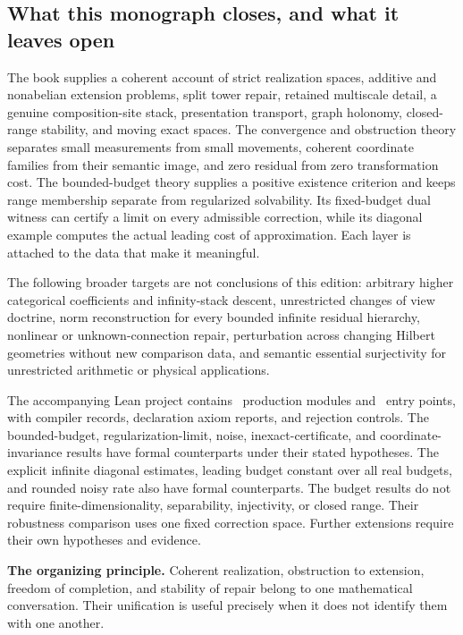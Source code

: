 \subsection{What this monograph closes, and what it leaves open}
The book supplies a coherent account of strict realization spaces, additive and nonabelian extension problems, split tower repair, retained multiscale detail, a genuine composition-site stack, presentation transport, graph holonomy, closed-range stability, and moving exact spaces. The convergence and obstruction theory separates small measurements from small movements, coherent coordinate families from their semantic image, and zero residual from zero transformation cost. The bounded-budget theory supplies a positive existence criterion and keeps range membership separate from regularized solvability. Its fixed-budget dual witness can certify a limit on every admissible correction, while its diagonal example computes the actual leading cost of approximation. Each layer is attached to the data that make it meaningful.

The following broader targets are not conclusions of this edition: arbitrary higher categorical coefficients and infinity-stack descent, unrestricted changes of view doctrine, norm reconstruction for every bounded infinite residual hierarchy, nonlinear or unknown-connection repair, perturbation across changing Hilbert geometries without new comparison data, and semantic essential surjectivity for unrestricted arithmetic or physical applications.

The accompanying Lean project contains \EditionProductionModules\ production modules and \EditionRoots\ entry points, with compiler records, declaration axiom reports, and rejection controls. The bounded-budget, regularization-limit, noise, inexact-certificate, and coordinate-invariance results have formal counterparts under their stated hypotheses. The explicit infinite diagonal estimates, leading budget constant over all real budgets, and rounded noisy rate also have formal counterparts. The budget results do not require finite-dimensionality, separability, injectivity, or closed range. Their robustness comparison uses one fixed correction space. Further extensions require their own hypotheses and evidence.

\begin{insight}
\textbf{The organizing principle.} Coherent realization, obstruction to extension, freedom of completion, and stability of repair belong to one mathematical conversation. Their unification is useful precisely when it does not identify them with one another.
\end{insight}
